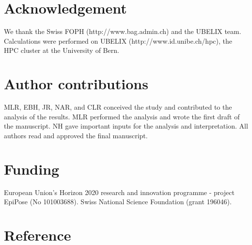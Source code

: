 \documentclass[10pt, a4paper, twoside]{article}
\begin{document}
\begin{multicols}{2}
\section{Acknowledgement}
We thank the Swiss FOPH (http://www.bag.admin.ch) and the UBELIX team. Calculations were performed on UBELIX (http://www.id.unibe.ch/hpc), the HPC cluster at the University of Bern.

\section{Author contributions}
MLR, EBH, JR, NAR, and CLR conceived the study and contributed to the analysis of the results.
MLR performed the analysis and wrote the first draft of the manuscript.
NH gave important inputs for the analysis and interpretation.
All authors read and approved the final manuscript.

\section{Funding}
European Union’s Horizon 2020 research and innovation programme - project EpiPose (No 101003688). Swiss National Science Foundation (grant 196046).

\section{Reference}



\end{multicols}
\end{document}

